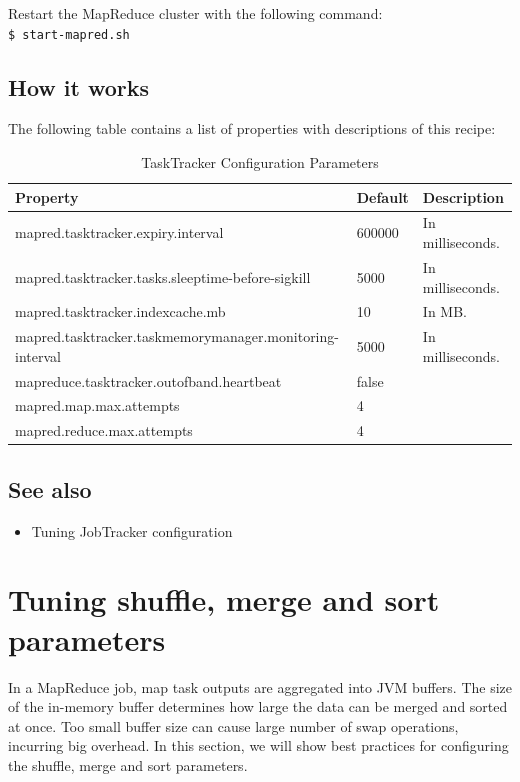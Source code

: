 Restart the MapReduce cluster with the following command: \\
\verb|$ start-mapred.sh|

\subsection*{How it works}
The following table contains a list of properties with descriptions of this recipe:
\begin{table}[ht]
  \centering
  \begin{tabular}{lll}
    \toprule
    \textbf{Property} & \textbf{Default} &  \textbf{Description}  \\ \midrule
      mapred.tasktracker.expiry.interval & 600000 & In milliseconds. \\
      mapred.tasktracker.tasks.sleeptime-before-sigkill & 5000 & In milliseconds. \\
      mapred.tasktracker.indexcache.mb & 10 & In MB. \\
      mapred.tasktracker.taskmemorymanager.monitoring-interval & 5000 & In milliseconds. \\
      mapreduce.tasktracker.outofband.heartbeat & false &  \\
      mapred.map.max.attempts & 4 & \\
      mapred.reduce.max.attempts & 4 &  \\ \bottomrule
  \end{tabular}
  \caption{TaskTracker Configuration Parameters}\label{tbl:tasktracker}
\end{table}

\subsection*{See also}
\begin{itemize}
  \item Tuning JobTracker configuration
\end{itemize}
\section{Tuning shuffle, merge and sort parameters}
In a MapReduce job, map task outputs are aggregated into JVM buffers. The size of the in-memory buffer determines how large the data can be merged and sorted at once. Too small buffer size can cause large number of swap operations, incurring big overhead. In this section, we will show best practices for configuring the shuffle, merge and sort parameters.
